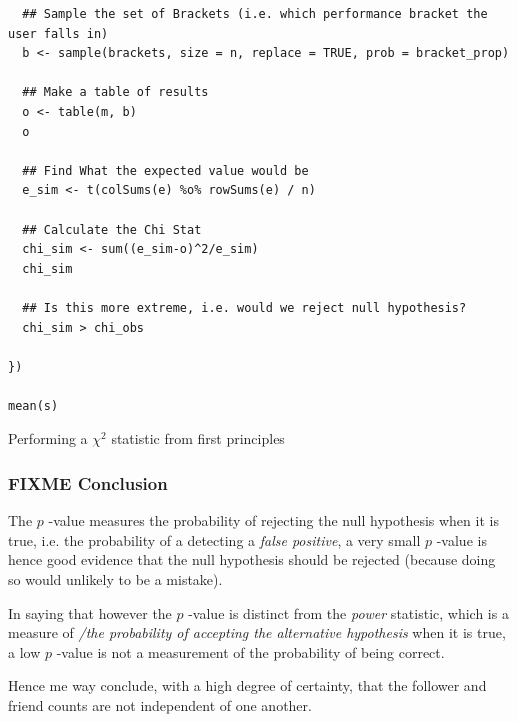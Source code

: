 \documentclass[11pt]{article}
\begin{document}
\begin{enumerate}
\begin{enumerate}
\begin{listing}[htbp]
\begin{verbatim}
  ## Sample the set of Brackets (i.e. which performance bracket the user falls in)
  b <- sample(brackets, size = n, replace = TRUE, prob = bracket_prop)

  ## Make a table of results
  o <- table(m, b)
  o

  ## Find What the expected value would be
  e_sim <- t(colSums(e) %o% rowSums(e) / n)

  ## Calculate the Chi Stat
  chi_sim <- sum((e_sim-o)^2/e_sim)
  chi_sim

  ## Is this more extreme, i.e. would we reject null hypothesis?
  chi_sim > chi_obs

})

mean(s)
\end{verbatim}
\caption{\label{org9630c55}Performing a \(\chi^{2}\) statistic from first principles}
\end{listing}
\end{enumerate}
\end{enumerate}
\subsubsection{{\bfseries\sffamily FIXME} Conclusion}
\label{sec:org2b0c16d}
The \(p\) -value measures the probability of rejecting the null hypothesis when it is true, i.e. the probability of a detecting a \emph{false positive}, a very small \(p\) -value is hence good evidence that the null hypothesis should be rejected (because doing so would unlikely to be a mistake).

In saying that however the \(p\) -value is distinct from the \emph{power} statistic, which is a measure of \emph{/the probability of accepting the alternative hypothesis} when it is true, a low \(p\) -value is not a measurement of the probability of being correct.

Hence me way conclude, with a high degree of certainty, that the follower and friend counts are not independent of one another.
\end{document}
